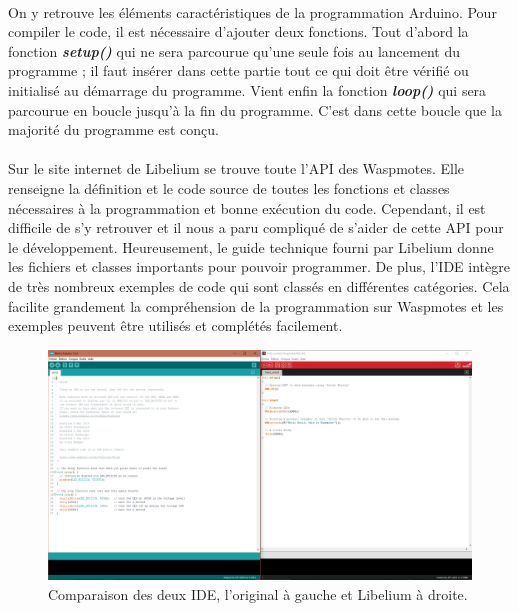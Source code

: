     \paragraph{}On y retrouve les éléments caractéristiques de la programmation Arduino. Pour compiler le code, il est nécessaire d'ajouter deux fonctions. Tout d'abord la fonction {\bfseries\color{black!70}\textit{setup()}} qui ne sera parcourue qu'une seule fois au lancement du programme ; il faut insérer dans cette partie tout ce qui doit être vérifié ou initialisé au démarrage du programme. Vient enfin la fonction {\bfseries\color{black!70}\textit{loop()}} qui sera parcourue en boucle jusqu'à la fin du programme. C'est dans cette boucle que la majorité du programme est conçu.
    
    \paragraph{}Sur le site internet de Libelium se trouve toute l'API des Waspmotes. Elle renseigne la définition et le code source de toutes les fonctions et classes nécessaires à la programmation et bonne exécution du code. Cependant, il est difficile de s'y retrouver et il nous a paru compliqué de s'aider de cette API pour le développement. Heureusement, le guide technique fourni par Libelium donne les fichiers et classes importants pour pouvoir programmer. De plus, l'IDE intègre de très nombreux exemples de code qui sont classés en différentes catégories. Cela facilite grandement la compréhension de la programmation sur Waspmotes et les exemples peuvent être utilisés et complétés facilement.
    
     \begin{figure}[h]
        \centering
        \includegraphics[scale=0.25]{images/photos/ide.png}
        \caption{Comparaison des deux IDE, l'original à gauche et Libelium à droite.}
        \label{fig:ide}
    \end{figure}
    
